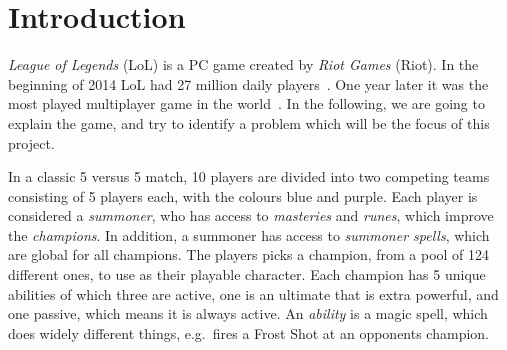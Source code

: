 \section{Introduction}\label{sec:intro}



\emph{League of Legends} (LoL) is a PC game created by \emph{Riot Games} (Riot). In the beginning of 2014 LoL had 27 million daily players~\cite{LoL27mill}. One year later it was the most played multiplayer game in the world~\cite{LoLmostplayed}. 
In the following, we are going to explain the game, and try to identify a problem which will be the focus of this project. 

In a classic 5 versus 5 match, 10 players are divided into two competing teams consisting of 5 players each, with the colours blue and purple. Each player is considered a \emph{summoner}, who has access to \emph{masteries} and \emph{runes}, which improve the \emph{champions}. In addition, a summoner has access to \emph{summoner spells}, which are global for all champions. The players picks a champion, from a pool of 124 different ones, to use as their playable character. Each champion has 5 unique abilities of which three are active, one is an ultimate that is extra powerful, and one passive, which means it is always active. An \emph{ability} is a magic spell, which does widely different things, e.g.\ fires a Frost Shot at an opponents champion. 

